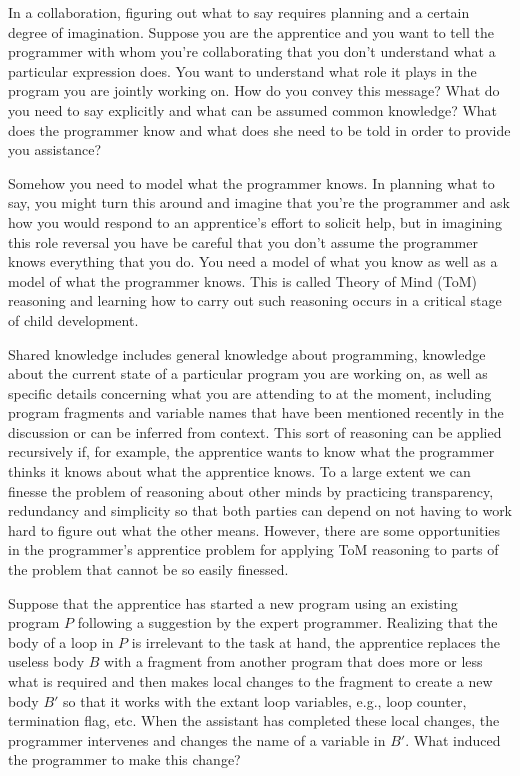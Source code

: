 
In a collaboration, figuring out what to say requires planning and a certain degree of imagination. Suppose you are the apprentice and you want to tell the programmer with whom you're collaborating that you don't understand what a particular expression does. You want to understand what role it plays in the program you are jointly working on. How do you convey this message? What do you need to say explicitly and what can be assumed common knowledge? What does the programmer know and what does she need to be told in order to provide you assistance?

Somehow you need to model what the programmer knows. In planning what to say, you might turn this around and imagine that you're the programmer and ask how you would respond to an apprentice's effort to solicit help, but in imagining this role reversal you have be careful that you don't assume the programmer knows everything that you do. You need a model of what you know as well as a model of what the programmer knows. This is called Theory of Mind (ToM) reasoning and learning how to carry out such reasoning occurs in a critical stage of child development.

Shared knowledge includes general knowledge about programming, knowledge about the current state of a particular program you are working on, as well as specific details concerning what you are attending to at the moment, including program fragments and variable names that have been mentioned recently in the discussion or can be inferred from context. This sort of reasoning can be applied recursively if, for example, the apprentice wants to know what the programmer thinks it knows about what the apprentice knows. To a large extent we can finesse the problem of reasoning about other minds by practicing transparency, redundancy and simplicity so that both parties can depend on not having to work hard to figure out what the other means. However, there are some opportunities in the programmer's apprentice problem for applying ToM reasoning to parts of the problem that cannot be so easily finessed.

Suppose that the apprentice has started a new program using an existing program $P$ following a suggestion by the expert programmer. Realizing that the body of a loop in $P$ is irrelevant to the task at hand, the apprentice replaces the useless body $B$ with a fragment from another program that does more or less what is required and then makes local changes to the fragment to create a new body $B'$ so that it works with the extant loop variables, e.g., loop counter, termination flag, etc. When the assistant has completed these local changes, the programmer intervenes and changes the name of a variable in $B'$. What induced the programmer to make this change?

